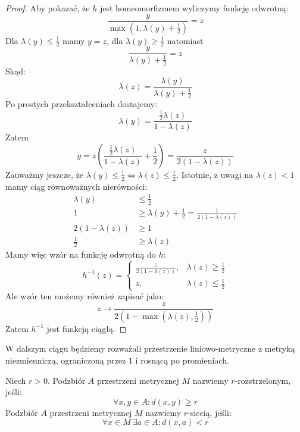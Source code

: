 \begin{lem}
\begin{proof}
    Aby pokazać, że $h$ jest homeomorfizmem wyliczymy funkcję odwrotną:
    \[
      \frac{y}{\max\left(1, \lambda(y) + \frac{1}{2}\right)} = z
    \]
    Dla $\lambda(y) \leq \frac{1}{2}$ mamy $y = z$, dla $\lambda(y) \geq \frac{1}{2}$ natomiast 
    \[
      \frac{y}{\lambda(y) + \frac{1}{2}} = z
    \]
    Skąd:
    \[
      \lambda(z) = \frac{\lambda(y)}{\lambda(y) + \frac{1}{2}}
    \]
    Po prostych przekształceniach dostajemy:
    \[
      \lambda(y) = \frac{\frac{1}{2} \lambda(z)}{1 - \lambda(z)}
    \]
    Zatem
    \[
      y = z\left(\frac{\frac{1}{2} \lambda(z)}{1 - \lambda(z)} + \frac{1}{2}\right) = \frac{z}{2(1-\lambda(z))}
    \]
    Zauważmy jeszcze, że $\lambda(y) \leq \frac{1}{2} \iff \lambda(z) \leq \frac{1}{2}$. Istotnie, z uwagi na $\lambda(z) < 1$ mamy ciąg równoważnych nierówności:
    \begin{align*}
      \lambda(y) &\leq \frac{1}{2} \\
      1 &\geq \lambda(y) + \frac{1}{2} = \frac{1}{2(1-\lambda(z))} \\
      2(1-\lambda(z)) &\geq 1 \\
      \frac{1}{2} &\geq \lambda(z)
    \end{align*}
    Mamy więc wzór na funkcję odwrotną do $h$:
    \[
      h^{-1}(z) = 
      \begin{cases}
        \frac{z}{2(1-\lambda(z))},&\lambda(z) \geq \frac{1}{2} \\
        z,&\lambda(z) \leq \frac{1}{2}
      \end{cases}
    \]
    Ale wzór ten możemy również zapisać jako:
    \[
      z \to \frac{z}{2(1-\max(\lambda(z), \frac{1}{2}))}
    \]
    Zatem $h^{-1}$ jest funkcją ciągłą.
  \end{proof}
\end{lem}

W dalszym ciągu będziemy rozważali przestrzenie liniowo-metryczne z metryką niezmienniczą, ograniczoną przez $1$ i rosnącą po promieniach.

\begin{df}
  Niech $r > 0$. Podzbiór $A$ przestrzeni metrycznej $M$ nazwiemy $r$-rozstrzelonym, jeśli:
  \[
    \forall x, y \in A: d(x,y) \geq r
  \]
  Podzbiór $A$ przestrzeni metrycznej $M$ nazwiemy $r$-siecią, jeśli:
  \[
    \forall x \in M\ \exists a \in A: d(x,a) < r
  \]
\end{df}

